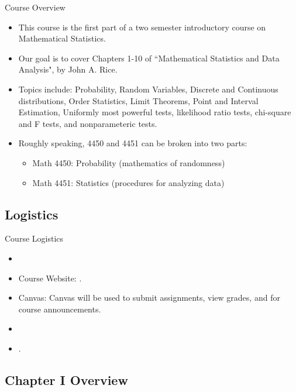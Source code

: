\begin{frame}{Course Overview}
  \begin{itemize}
  \item This course is the first part of a two semester introductory course on Mathematical Statistics.
  \item Our goal is to cover Chapters 1-10 of ``Mathematical Statistics and Data Analysis", by John A. Rice.
  \item Topics include: Probability, Random Variables, Discrete and Continuous distributions, Order Statistics, Limit Theorems, Point and Interval Estimation, Uniformly most powerful tests, likelihood ratio tests, chi-square and F tests, and nonparameteric tests.
  \item Roughly speaking, 4450 and 4451 can be broken into two parts: 
  \begin{itemize}
    \item Math 4450: Probability (mathematics of randomness)
    \item Math 4451: Statistics (procedures for analyzing data)
  \end{itemize}
  \end{itemize}
\end{frame}

\subsection{Logistics}

\begin{frame}{Course Logistics}
  \begin{itemize}
    \item {}
    \item Course Website: . 
    \item Canvas: Canvas will be used to submit assignments, view grades, and for course announcements.
    \item {}
    \item {}.
  \end{itemize}
\end{frame}

\subsection{Chapter I Overview}

